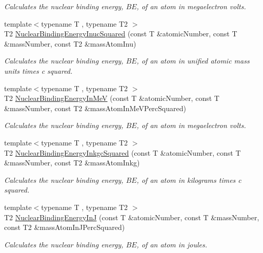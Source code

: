 \begin{DoxyCompactItemize}
\begin{DoxyCompactList}\small\item\em Calculates the nuclear binding energy, $BE$, of an atom in megaelectron volts. \end{DoxyCompactList}\item 
{\footnotesize template$<$typename T , typename T2 $>$ }\\T2 \mbox{\hyperlink{group___e_g_x_phys-_nuclear_binding_energy_gafeed0fb7220e4900a8da011ed9fca44f}{Nuclear\+Binding\+Energy\+Inuc\+Squared}} (const T \&atomic\+Number, const T \&mass\+Number, const T2 \&mass\+Atom\+Inu)
\begin{DoxyCompactList}\small\item\em Calculates the nuclear binding energy, $BE$, of an atom in unified atomic mass units times c squared. \end{DoxyCompactList}\item 
{\footnotesize template$<$typename T , typename T2 $>$ }\\T2 \mbox{\hyperlink{group___e_g_x_phys-_nuclear_binding_energy_ga25f5d2d32fad7e28e278cf8b5ea8ffa8}{Nuclear\+Binding\+Energy\+In\+MeV}} (const T \&atomic\+Number, const T \&mass\+Number, const T2 \&mass\+Atom\+In\+Me\+V\+Perc\+Squared)
\begin{DoxyCompactList}\small\item\em Calculates the nuclear binding energy, $BE$, of an atom in megaelectron volts. \end{DoxyCompactList}\item 
{\footnotesize template$<$typename T , typename T2 $>$ }\\T2 \mbox{\hyperlink{group___e_g_x_phys-_nuclear_binding_energy_gaf229d8c0d2aa30ff95aa20e5213df3bd}{Nuclear\+Binding\+Energy\+Inkgc\+Squared}} (const T \&atomic\+Number, const T \&mass\+Number, const T2 \&mass\+Atom\+Inkg)
\begin{DoxyCompactList}\small\item\em Calculates the nuclear binding energy, $BE$, of an atom in kilograms times c squared. \end{DoxyCompactList}\item 
{\footnotesize template$<$typename T , typename T2 $>$ }\\T2 \mbox{\hyperlink{group___e_g_x_phys-_nuclear_binding_energy_gae48a95188d9b71b36d02babf227b9449}{Nuclear\+Binding\+Energy\+InJ}} (const T \&atomic\+Number, const T \&mass\+Number, const T2 \&mass\+Atom\+In\+J\+Perc\+Squared)
\begin{DoxyCompactList}\small\item\em Calculates the nuclear binding energy, $BE$, of an atom in joules. \end{DoxyCompactList}\item 

\end{DoxyCompactItemize}
